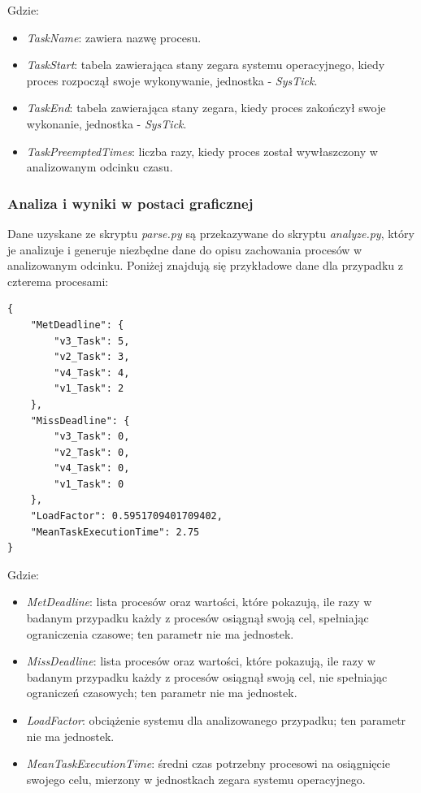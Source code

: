 \documentclass[../../main]{subfiles}
\begin{document}
Gdzie:

\begin{itemize}
    \item \textit{TaskName}: zawiera nazwę procesu.
    \item \textit{TaskStart}: tabela zawierająca stany zegara systemu operacyjnego, kiedy proces rozpoczął swoje wykonywanie, jednostka - \textit{SysTick}.
    \item \textit{TaskEnd}: tabela zawierająca stany zegara, kiedy proces zakończył swoje wykonanie, jednostka - \textit{SysTick}.
    \item \textit{TaskPreemptedTimes}: liczba razy, kiedy proces został wywłaszczony w analizowanym odcinku czasu.
\end{itemize}

\subsubsection{Analiza i wyniki w postaci graficznej}

Dane uzyskane ze skryptu \textit{parse.py} są przekazywane do skryptu \textit{analyze.py}, który je analizuje i generuje niezbędne dane do opisu zachowania procesów w analizowanym odcinku. Poniżej znajdują się przykładowe dane dla przypadku z czterema procesami:

\begin{lstlisting}[caption={Przykładowe wyniki analizy dla czterech procesów}, label={lst:example-process-analisys}]
{
    "MetDeadline": {
        "v3_Task": 5,
        "v2_Task": 3,
        "v4_Task": 4,
        "v1_Task": 2
    },
    "MissDeadline": {
        "v3_Task": 0,
        "v2_Task": 0,
        "v4_Task": 0,
        "v1_Task": 0
    },
    "LoadFactor": 0.5951709401709402,
    "MeanTaskExecutionTime": 2.75
}
\end{lstlisting}

Gdzie:

\begin{itemize}
    \item \textit{MetDeadline}: lista procesów oraz wartości, które pokazują, ile razy w badanym przypadku każdy z procesów osiągnął swoją cel, spełniając ograniczenia czasowe; ten parametr nie ma jednostek.
    \item \textit{MissDeadline}: lista procesów oraz wartości, które pokazują, ile razy w badanym przypadku każdy z procesów osiągnął swoją cel, nie spełniając ograniczeń czasowych; ten parametr nie ma jednostek.
    \item \textit{LoadFactor}: obciążenie systemu dla analizowanego przypadku; ten parametr nie ma jednostek.
    \item \textit{MeanTaskExecutionTime}: średni czas potrzebny procesowi na osiągnięcie swojego celu, mierzony w jednostkach zegara systemu operacyjnego. 
\end{itemize}
\end{document}
